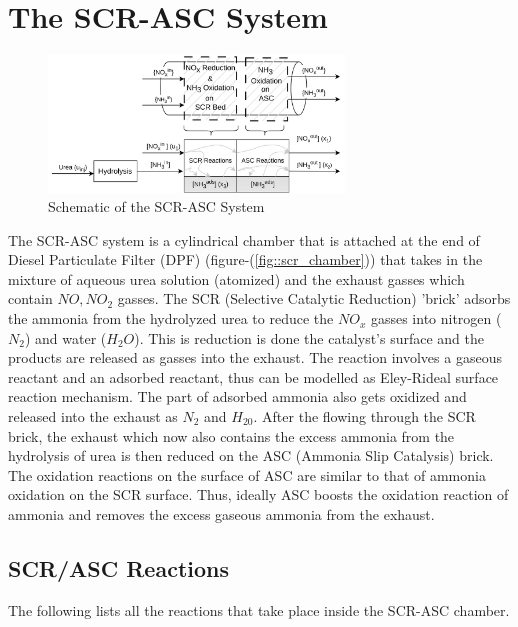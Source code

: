 \chapter{The SCR-ASC System}

\begin{figure}[H]
        \centering
        \includegraphics[width=0.7\textwidth]{Part3/figs/SCR-ASC_model.png}
        \caption{Schematic of the SCR-ASC System}
        \label{fig::scr-asc_schematic}
\end{figure}

The SCR-ASC system is a cylindrical chamber that is attached at the end of Diesel Particulate Filter (DPF) (figure-(\ref{fig::scr_chamber})) that takes in the mixture of aqueous urea solution (atomized) and the exhaust gasses which contain $NO, NO_2$ gasses. The SCR (Selective Catalytic Reduction) 'brick' adsorbs the ammonia from the hydrolyzed urea to reduce the $NO_x$ gasses into nitrogen ($N_2$) and water ($H_2O$). This is reduction is done the catalyst's surface and the products are released as gasses into the exhaust. The reaction involves a gaseous reactant and an adsorbed reactant, thus can be modelled as Eley-Rideal surface reaction mechanism. The part of adsorbed ammonia also gets oxidized and released into the exhaust as $N_2$ and $H_20$. After the flowing through the SCR brick, the exhaust which now also contains the excess ammonia from the hydrolysis of urea is then reduced on the ASC (Ammonia Slip Catalysis) brick. The oxidation reactions on the surface of ASC are similar to that of ammonia oxidation on the SCR surface. Thus, ideally ASC boosts the oxidation reaction of ammonia and removes the excess gaseous ammonia from the exhaust.


\section{SCR/ASC Reactions}
The following lists all the reactions that take place inside the SCR-ASC chamber.

